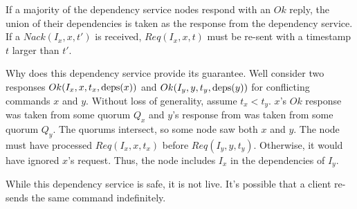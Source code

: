 If a majority of the dependency service nodes respond with an $Ok$ reply, the
union of their dependencies is taken as the response from the dependency
service. If a $Nack(I_x, x, t')$ is received, $Req(I_x, x, t)$ must be re-sent
with a timestamp $t$ larger than $t'$.

Why does this dependency service provide its guarantee. Well consider two
responses $Ok(I_x, x, t_x, \text{deps}(x))$ and $Ok(I_y, y, t_y, \text{deps}(y))$ for
conflicting commands $x$ and $y$. Without loss of generality, assume $t_x <
t_y$. $x$'s $Ok$ response was taken from some quorum $Q_x$ and $y$'s response
from was taken from some quorum $Q_y$. The quorums intersect, so some node saw
both $x$ and $y$. The node must have processed $Req(I_x, x, t_x)$ before
$Req(I_y, y, t_y)$. Otherwise, it would have ignored $x$'s request. Thus, the
node includes $I_x$ in the dependencies of $I_y$.

While this dependency service is safe, it is not live. It's possible that a
client re-sends the same command indefinitely.
